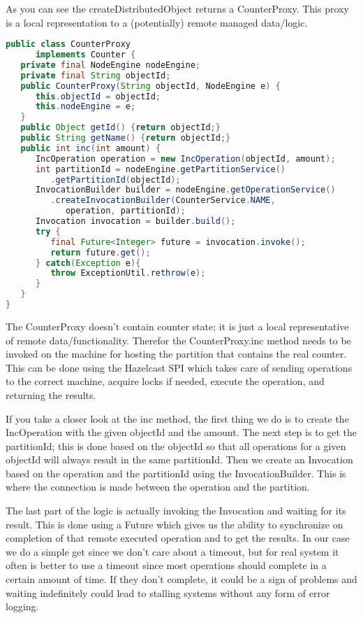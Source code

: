 As you can see the createDistributedObject returns a CounterProxy. This proxy is a local representation to a (potentially) remote managed data/logic.  
\begin{lstlisting}[language=java]
public class CounterProxy 
      implements Counter {
   private final NodeEngine nodeEngine;
   private final String objectId;
   public CounterProxy(String objectId, NodeEngine e) {
      this.objectId = objectId;      
      this.nodeEngine = e;  
   }
   public Object getId() {return objectId;}
   public String getName() {return objectId;}
   public int inc(int amount) {
      IncOperation operation = new IncOperation(objectId, amount);   
      int partitionId = nodeEngine.getPartitionService()
         .getPartitionId(objectId);
      InvocationBuilder builder = nodeEngine.getOperationService()
         .createInvocationBuilder(CounterService.NAME, 
            operation, partitionId);
      Invocation invocation = builder.build();
      try {
         final Future<Integer> future = invocation.invoke();
         return future.get();
      } catch(Exception e){
         throw ExceptionUtil.rethrow(e);
      }
   }
}
\end{lstlisting}
The CounterProxy doesn't contain counter state; it is just a local representative of remote data/functionality. Therefor the CounterProxy.inc method needs to be invoked on the machine for hosting the partition that contains the real counter. This can be done using the Hazelcast SPI which takes care of sending operations to the correct machine, acquire locks if needed, execute the operation, and returning the results.

If you take a closer look at the inc method, the first thing we do is to create the IncOperation with the given objectId and the amount. The next step is to get the partitionId; this is done based on the objectId so that all operations for a given objectId will always result in the same partitionId. Then we create an Invocation based on the operation and the partitionId using the InvocationBuilder. This is where the connection is made between the operation and the partition. 

The last part of the logic is actually invoking the Invocation and waiting for its result. This is done using a Future which gives us the ability to synchronize on completion of that remote executed operation and to get the results. In our case we do a simple get since we don't care about a timeout, but for real system it often is better to use a timeout since most operations should complete in a certain amount of time. If they don't complete, it could be a sign of problems and waiting indefinitely could lead to stalling systems without any form of error logging.

